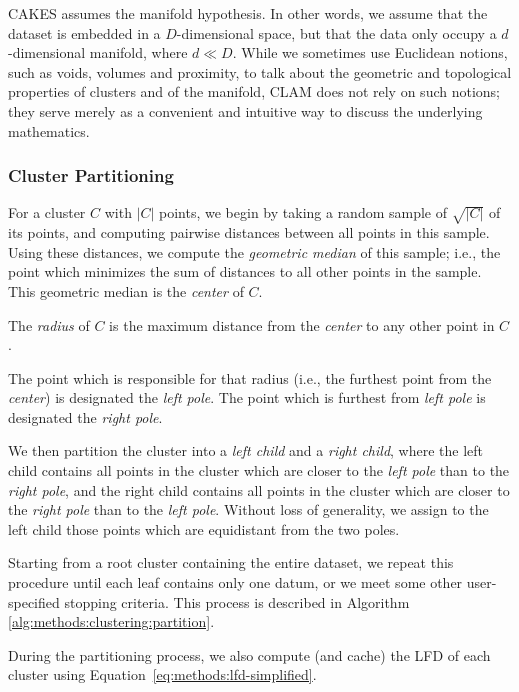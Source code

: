 CAKES assumes the manifold hypothesis. 
In other words, we assume that the dataset is embedded in a $D$-dimensional space, but that the data only occupy a $d$-dimensional manifold, where $d \ll D$. 
While we sometimes use Euclidean notions, such as voids, volumes and proximity, to talk about the geometric and topological properties of clusters and of the manifold, CLAM does not rely on such notions; 
they serve merely as a convenient and intuitive way to discuss the underlying mathematics.


\subsubsection {Cluster Partitioning}
\label{subsubsec:methods:cluster-partitioning}

For a cluster $C$ with $|C|$ points, we begin by taking a random sample of $\sqrt{|C|}$ of its points, and computing pairwise distances between all points in this sample.
Using these distances, we compute the \emph{geometric median} of this sample; 
i.e., the point which minimizes the sum of distances to all other points in the sample.
This geometric median is the \emph{center} of $C$.

The \emph{radius} of $C$ is the maximum distance from the \emph{center} to any other point in $C$.

The point which is responsible for that radius (i.e., the furthest point from the \emph{center}) is designated the \emph{left pole}.
The point which is furthest from \emph{left pole} is designated the \emph{right pole}.

We then partition the cluster into a \emph{left child} and a \emph{right child}, where the left child contains all points in the cluster which are closer to the \emph{left pole} than to the \emph{right pole}, and the right child contains all points in the cluster which are closer to the \emph{right pole} than to the \emph{left pole}.
Without loss of generality, we assign to the left child those points which are equidistant from the two poles.

Starting from a root cluster containing the entire dataset, we repeat this procedure until each leaf contains only one datum, or we meet some other user-specified stopping criteria.
This process is described in Algorithm \ref{alg:methods:clustering:partition}.

During the partitioning process, we also compute (and cache) the LFD of each cluster using Equation~\ref{eq:methods:lfd-simplified}.

